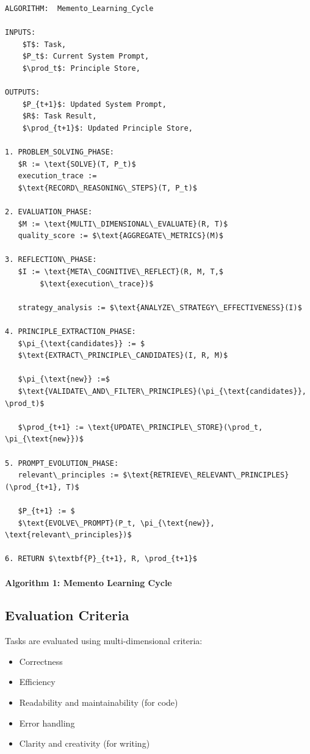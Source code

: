 \documentclass[10pt,a4paper,twocolumn]{article}
\begin{document}
\begin{lstlisting}[mathescape=true]
ALGORITHM:  Memento_Learning_Cycle 

INPUTS:
    $T$: Task, 
    $P_t$: Current System Prompt,
    $\prod_t$: Principle Store, 

OUTPUTS: 
    $P_{t+1}$: Updated System Prompt, 
    $R$: Task Result, 
    $\prod_{t+1}$: Updated Principle Store,

1. PROBLEM_SOLVING_PHASE:
   $R := \text{SOLVE}(T, P_t)$
   execution_trace := 
   $\text{RECORD\_REASONING\_STEPS}(T, P_t)$

2. EVALUATION_PHASE:
   $M := \text{MULTI\_DIMENSIONAL\_EVALUATE}(R, T)$
   quality_score := $\text{AGGREGATE\_METRICS}(M)$

3. REFLECTION\_PHASE:
   $I := \text{META\_COGNITIVE\_REFLECT}(R, M, T,$ 
        $\text{execution\_trace})$
   
   strategy_analysis := $\text{ANALYZE\_STRATEGY\_EFFECTIVENESS}(I)$

4. PRINCIPLE_EXTRACTION_PHASE:
   $\pi_{\text{candidates}} := $
   $\text{EXTRACT\_PRINCIPLE\_CANDIDATES}(I, R, M)$

   $\pi_{\text{new}} :=$ 
   $\text{VALIDATE\_AND\_FILTER\_PRINCIPLES}(\pi_{\text{candidates}}, \prod_t)$

   $\prod_{t+1} := \text{UPDATE\_PRINCIPLE\_STORE}(\prod_t, \pi_{\text{new}})$

5. PROMPT_EVOLUTION_PHASE:
   relevant\_principles := $\text{RETRIEVE\_RELEVANT\_PRINCIPLES}(\prod_{t+1}, T)$    

   $P_{t+1} := $
   $\text{EVOLVE\_PROMPT}(P_t, \pi_{\text{new}}, \text{relevant\_principles})$

6. RETURN $\textbf{P}_{t+1}, R, \prod_{t+1}$
\end{lstlisting}
\paragraph{Algorithm 1: Memento Learning Cycle}




\subsection{Evaluation Criteria}


 Tasks are evaluated using multi-dimensional criteria:

\begin{itemize}
    \item Correctness
    \item Efficiency
    \item Readability and maintainability (for code)
    \item Error handling
    \item Clarity and creativity (for writing)



\end{itemize}
\end{document}
